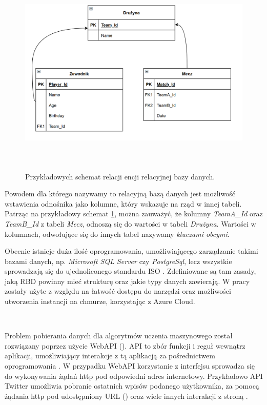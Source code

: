 \begin{figure}[h] 
        \centering\includegraphics[width=14cm,height=10cm]{figures/Example_entities.PNG}
        \caption{Przykładowych schemat relacji encji relacyjnej bazy danych.}\label{example-Entity}
\end{figure}

Powodem dla którego nazywamy to relacyjną bazą danych jest możliwość wstawienia odnośnika jako kolumne, który wskazuje na rząd w innej tabeli. Patrząc na przykładowy schemat \ref{example-Entity}, można zauważyć, że kolumny \textit{TeamA\_Id} oraz \textit{TeamB\_Id} z tabeli \textit{Mecz}, odnoszą się do wartości w tabeli \textit{Drużyna}. Wartości w kolumnach, odwołujące się do innych tabel nazywamy \textit{kluczami obcymi}. \cite{Relational_Databases_Milan}

Obecnie istnieje duża ilość oprogramowania, umożliwiającego zarządzanie takimi bazami danych, np. \textit{Microsoft SQL Server} czy \textit{PostgreSql}, lecz wszystkie sprowadzają się do ujednoliconego standardu ISO \cite{SQL_ISO}. Zdefiniowane są tam zasady, jaką RBD powinny mieć strukturę oraz jakie typy danych zawierają. W pracy zostały użyte z względu na łatwość dostępu do narzędzi oraz możliwości utworzenia instancji na chmurze, korzystając z Azure Cloud.

~

Problem pobierania danych dla algorytmów uczenia maszynowego został rozwiązany poprzez użycie WebAPI (). API to zbór funkcji i reguł wewnątrz aplikacji, umożliwiający interakcje z tą aplikacją za pośrednictwem oprogramowania \cite{webAPI_Mozzila}. W przypadku WebAPI korzystanie z interfejsu sprowadza się do wykonywania żądań http pod odpowiedni adres internetowy. Przykładowo API Twitter umożliwia pobranie ostatnich wpisów podanego użytkownika, za pomocą żądania http pod udostępniony URL () oraz wiele innych interakcji z stroną \cite{Twitter_API}.


